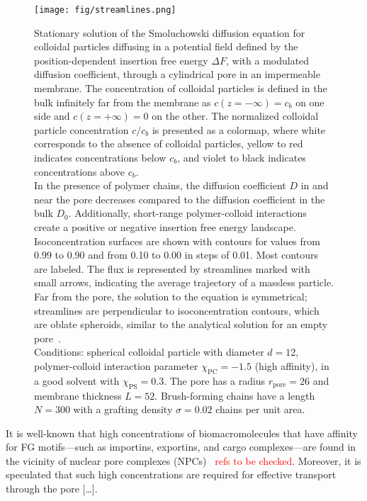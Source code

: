 \documentclass[12pt, a4paper]{article}
\newcommand\todo[1]{\textcolor{red}{#1}}
\begin{document}
\begin{figure}
    \centering
    \texttt{[image: fig/streamlines.png]}
    \caption{
    Stationary solution of the Smoluchowski diffusion equation for colloidal particles diffusing in a potential field defined by the position-dependent insertion free energy $\Delta F$, with a modulated diffusion coefficient, through a cylindrical pore in an impermeable membrane.
    The concentration of colloidal particles is defined in the bulk infinitely far from the membrane as $c(z = -\infty) = c_{b}$ on one side and $c(z = +\infty) = 0$ on the other.
    The normalized colloidal particle concentration $c / c_{b}$ is presented as a colormap, where white corresponds to the absence of colloidal particles, yellow to red indicates concentrations below $c_{b}$, and violet to black indicates concentrations above $c_{b}$.
    \\
    In the presence of polymer chains, the diffusion coefficient $D$ in and near the pore decreases compared to the diffusion coefficient in the bulk $D_0$.
    Additionally, short-range polymer-colloid interactions create a positive or negative insertion free energy landscape.
    \\
    Isoconcentration surfaces are shown with contours for values from 0.99 to 0.90 and from 0.10 to 0.00 in steps of 0.01.
    Most contours are labeled.
    The flux is represented by streamlines marked with small arrows, indicating the average trajectory of a massless particle.
    \\
    Far from the pore, the solution to the equation is symmetrical; streamlines are perpendicular to isoconcentration contours, which are oblate spheroids, similar to the analytical solution for an empty pore~\cite{Brunn1984}.
    \\
    Conditions: spherical colloidal particle with diameter $d = 12$, polymer-colloid interaction parameter $\chi_{\textrm{PC}} = -1.5$ (high affinity), in a good solvent with $\chi_{\textrm{PS}} = 0.3$.
    The pore has a radius $r_{\textrm{pore}} = 26$ and membrane thickness $L = 52$.
    Brush-forming chains have a length $N = 300$ with a grafting density $\sigma = 0.02$ chains per unit area.
    }
    \label{fig:colloid_concentration}
\end{figure}

It is well-known that high concentrations of biomacromolecules that have affinity for FG motifs—such as importins, exportins, and cargo complexes—are found in the vicinity of nuclear pore complexes (NPCs)~\cite{Beck2007, Gruenwald2010, Tu2011} \todo{refs to be checked}.
Moreover, it is speculated that such high concentrations are required for effective transport through the pore [\dots].
\end{document}

